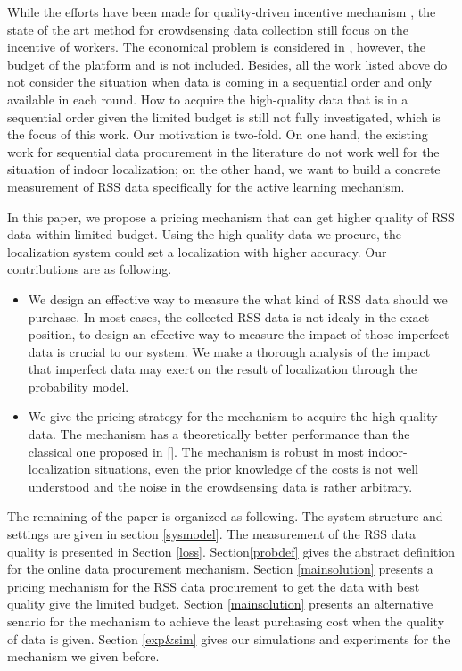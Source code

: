 \documentclass[10pt,conference,compsocconf,letterpaper]{IEEEtran}
\begin{document}
While the efforts have been made for quality-driven incentive mechanism \cite{lbs2,jin2015quality,peng2015pay,gao2015providing}, the state of the art method for crowdsensing data collection still focus on the incentive of workers. The economical problem is considered in \cite{peng2015pay}, however, the budget of the platform and is not included. Besides, all the work listed above do not consider the situation when data is coming in a sequential order and only
available in each round. How to acquire the high-quality data that is in a sequential order given the limited budget is still not fully investigated, which is the focus of this work. Our motivation is two-fold. On one hand, the existing work for sequential data procurement in the literature \cite{abernethy2015low}do not work well for the situation of indoor localization; on the other hand, we want to build a concrete measurement of RSS data specifically for the active learning mechanism. 

In this paper, we propose a pricing mechanism that can get higher quality of RSS data within limited budget. Using the high quality data we procure, the localization system could set a localization with higher accuracy. Our contributions are as following.


\begin{itemize}

\item  We design an effective way to measure the what kind of RSS data should we purchase. In most cases, the collected RSS data is not idealy in the exact position, to design an effective way to measure the impact of those imperfect data is crucial to our system. We make a thorough analysis of the impact that imperfect data may exert on the result of localization through the  probability model. 

\item We give the pricing strategy for the mechanism to acquire the high quality data. The mechanism has a theoretically better performance than the classical one proposed in \ref{}. The mechanism is robust in most indoor-localization situations, even the prior knowledge of the costs is not well understood and the noise in the crowdsensing data is rather arbitrary. 

\end{itemize}

The remaining of the paper is organized as following. The system structure and settings are given in section \ref{sysmodel}. The measurement of the RSS data quality is presented in Section \ref{loss}. Section\ref{probdef}  gives the abstract definition for the online data procurement mechanism. Section \ref{mainsolution} presents a pricing mechanism for the RSS data procurement to get the data with best quality give the limited budget. Section \ref{mainsolution} presents an alternative senario for the mechanism to achieve the least purchasing cost when the quality of data is given. Section \ref{exp&sim} gives our simulations and experiments for the mechanism we given before.
\end{document}

